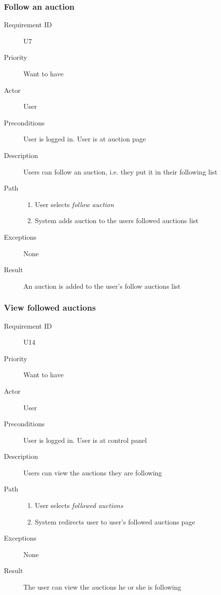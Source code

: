 		\subsubsection{Follow an auction}
			\begin{description}
				\item[Requirement ID] U7
				\item[Priority] Want to have
				\item[Actor] User
				\item[Preconditions] User is logged in. User is at auction page
				\item[Description] Users can follow an auction, i.e. they put it in their following list
				\item[Path]
 					\begin{enumerate}
						\item User selects \emph{follow auction}
						\item System adds auction to the users followed auctions list
					\end{enumerate}
				\item[Exceptions] None
				\item[Result] An auction is added to the user's follow auctions list
			\end{description}
		\subsubsection{View followed auctions}
			\begin{description}
				\item[Requirement ID] U14
				\item[Priority] Want to have
				\item[Actor] User
				\item[Preconditions] User is logged in. User is at control panel
				\item[Description] Users can view the auctions they are following
				\item[Path]
 					\begin{enumerate}
						\item User selects \emph{followed auctions}
						\item System redirects user to user's followed auctions page
					\end{enumerate}
				\item[Exceptions] None
				\item[Result] The user can view the auctions he or she is following
			\end{description}
